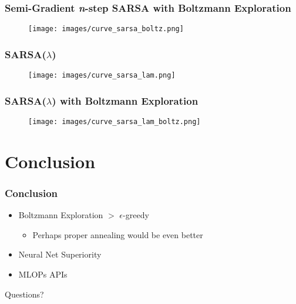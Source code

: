 \documentclass{beamer}
\begin{document}
\begin{frame}
    \frametitle{Semi-Gradient \emph{n}-step SARSA with Boltzmann Exploration}
    \begin{figure}
        \texttt{[image: images/curve\_sarsa\_boltz.png]}
      \end{figure}
\end{frame}

\begin{frame}
    \frametitle{SARSA(\(\lambda\))}
    \begin{figure}
        \texttt{[image: images/curve\_sarsa\_lam.png]}
      \end{figure}
\end{frame}

\begin{frame}
    \frametitle{SARSA(\(\lambda\)) with Boltzmann Exploration}
    \begin{figure}
        \texttt{[image: images/curve\_sarsa\_lam\_boltz.png]}
      \end{figure}
\end{frame}

\section{Conclusion}

\begin{frame}
    \frametitle{Conclusion}
    \begin{itemize}
        \item Boltzmann Exploration \(>\) \(\epsilon\)-greedy
        \begin{itemize}
            \item Perhaps proper annealing would be even better
        \end{itemize}
        \item Neural Net Superiority
        \item MLOPs APIs
    \end{itemize}
\end{frame}





\begin{frame}
    Questions?
\end{frame}
\end{document}
